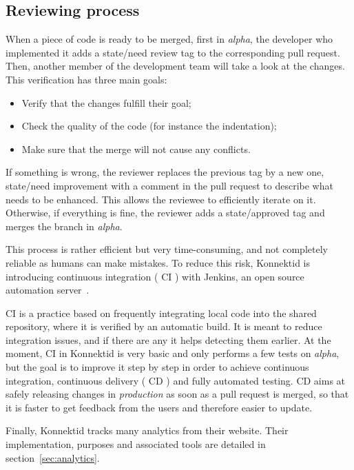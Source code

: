 \subsection{Reviewing process}
\label{ssec:reviewing}

When a piece of code is ready to be merged, first in \textit{alpha}, the developer who implemented it adds a \guillemotleft{} state/need review \guillemotright{} tag to the corresponding pull request. Then, another member of the development team will take a look at the changes. This verification has three main goals:

\begin{itemize}[noitemsep]
	\item Verify that the changes fulfill their goal;
 	\item Check the quality of the code (for instance the indentation);
	\item Make sure that the merge will not cause any conflicts.
\end{itemize}

If something is wrong, the reviewer replaces the previous tag by a new one, \guillemotleft{} state/need improvement \guillemotright{} with a comment in the pull request to describe what needs to be enhanced. This allows the reviewee to efficiently iterate on it. Otherwise, if everything is fine, the reviewer adds a \guillemotleft{} state/approved \guillemotright{} tag and merges the branch in \textit{alpha}.

This process is rather efficient but very time-consuming, and not completely reliable as humans can make mistakes. To reduce this risk, Konnektid is introducing continuous integration (\guillemotleft{} CI \guillemotright{}) with Jenkins, an open source automation server~\cite{jenkins}. 

CI is a practice based on frequently integrating local code into the shared repository, where it is verified by an automatic build. It is meant to reduce integration issues, and if there are any it helps detecting them earlier. At the moment, CI in Konnektid is very basic and only performs a few tests on \textit{alpha}, but the goal is to improve it step by step in order to achieve continuous integration, continuous delivery (\guillemotleft{} CD \guillemotright{}) and fully automated testing. CD aims at safely releasing changes in \textit{production} as soon as a pull request is merged, so that it is faster to get feedback from the users and therefore easier to update.

Finally, Konnektid tracks many analytics from their website. Their implementation, purposes and associated tools are detailed in  {\sc section}~\ref{sec:analytics}.